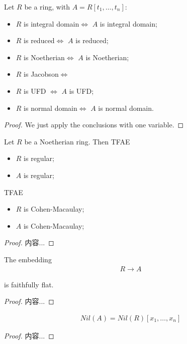 \documentclass[Total.tex]{subfiles}
\begin{document}
			\begin{proposition}
				Let $R$ be a ring, with $A=R[t_1,\dots,t_n]$:
				\begin{itemize}
					\item $R$ is integral domain$\Leftrightarrow$ $A$ is integral domain;
					\item $R$ is reduced$\Leftrightarrow$ $A$ is reduced;
					\item $R$ is Noetherian$\Leftrightarrow$ $A$ is Noetherian;
					\item $R$ is Jacobson$\Leftrightarrow$ 
					\item $R$ is UFD $\Leftrightarrow$ $A$ is UFD;
					\item $R$ is normal domain$\Leftrightarrow$ $A$ is normal domain. 
				\end{itemize}
			\end{proposition}
			\begin{proof}
				We just apply the conclusions with one variable. 
			\end{proof}
			
			\begin{proposition}
				Let $R$ be a Noetherian ring. Then TFAE
				\begin{itemize}
					\item $R$ is regular;
					\item $A$ is regular;
				\end{itemize}
				
				TFAE
				\begin{itemize}
					\item $R$ is Cohen-Macaulay;
					\item $A$ is Cohen-Macaulay;
				\end{itemize}
			\end{proposition}
			\begin{proof}
				内容...
			\end{proof}
			
			\begin{proposition}
				The embedding 
				\begin{gather*}
					R\rightarrow A
				\end{gather*}
				
				is faithfully flat.
			\end{proposition}
			\begin{proof}
				内容...
			\end{proof}
			
			\begin{proposition}
				\begin{gather*}
					Nil(A)=Nil(R)[x_1,\dots,x_n]
				\end{gather*}
			\end{proposition}
			\begin{proof}
				内容...
			\end{proof}
			
\end{document}
